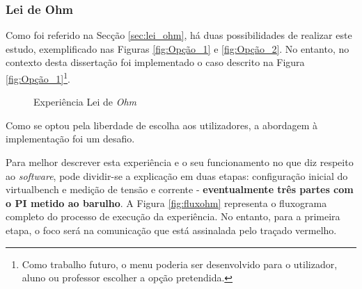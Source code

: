 \subsubsection{Lei de Ohm}
Como foi referido na Secção \ref{sec:lei_ohm}, há duas possibilidades de realizar este estudo, exemplificado nas Figuras \ref{fig:Opção_1} e \ref{fig:Opção_2}. No entanto, no contexto desta dissertação foi  implementado o caso descrito na Figura \ref{fig:Opção_1}\footnote{Como trabalho futuro, o menu poderia ser desenvolvido para o utilizador, aluno ou professor escolher a opção pretendida.}. 

\begin{figure}[hbtp]
	\centering%
		\centering
		\qquad
		\caption{Experiência Lei de \textit{Ohm}}%
		\label{fig:experienciaOHM}%
	\end{figure}

Como se optou pela liberdade de escolha aos utilizadores, a abordagem à implementação foi um desafio.

Para melhor descrever esta experiência e o seu funcionamento no que diz respeito ao \textit{software}, pode dividir-se a explicação em duas etapas: configuração inicial do \acrshort{virtualbench} e medição de tensão e corrente - \textbf{eventualmente três partes com o PI metido ao barulho}. A Figura \ref{fig:fluxohm} representa o fluxograma completo do processo de execução da experiência. No entanto, para a primeira etapa, o foco será na comunicação que está assinalada pelo traçado vermelho.

